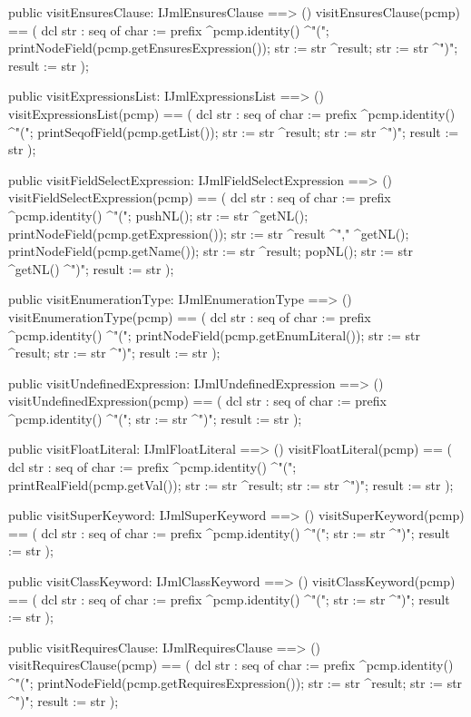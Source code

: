 \begin{vdm_al}
  public visitEnsuresClause: IJmlEnsuresClause ==> ()
  visitEnsuresClause(pcmp) ==
    ( dcl str : seq of char := prefix ^pcmp.identity() ^"(";
      printNodeField(pcmp.getEnsuresExpression());
      str := str ^result;
      str := str ^")";
      result := str );

  public visitExpressionsList: IJmlExpressionsList ==> ()
  visitExpressionsList(pcmp) ==
    ( dcl str : seq of char := prefix ^pcmp.identity() ^"(";
      printSeqofField(pcmp.getList());
      str := str ^result;
      str := str ^")";
      result := str );

  public visitFieldSelectExpression: IJmlFieldSelectExpression ==> ()
  visitFieldSelectExpression(pcmp) ==
    ( dcl str : seq of char := prefix ^pcmp.identity() ^"(";
      pushNL();
      str := str ^getNL();
      printNodeField(pcmp.getExpression());
      str := str ^result ^"," ^getNL();
      printNodeField(pcmp.getName());
      str := str ^result;
      popNL();
      str := str ^getNL() ^")";
      result := str );

  public visitEnumerationType: IJmlEnumerationType ==> ()
  visitEnumerationType(pcmp) ==
    ( dcl str : seq of char := prefix ^pcmp.identity() ^"(";
      printNodeField(pcmp.getEnumLiteral());
      str := str ^result;
      str := str ^")";
      result := str );

  public visitUndefinedExpression: IJmlUndefinedExpression ==> ()
  visitUndefinedExpression(pcmp) ==
    ( dcl str : seq of char := prefix ^pcmp.identity() ^"(";
      str := str ^")";
      result := str );

  public visitFloatLiteral: IJmlFloatLiteral ==> ()
  visitFloatLiteral(pcmp) ==
    ( dcl str : seq of char := prefix ^pcmp.identity() ^"(";
      printRealField(pcmp.getVal());
      str := str ^result;
      str := str ^")";
      result := str );

  public visitSuperKeyword: IJmlSuperKeyword ==> ()
  visitSuperKeyword(pcmp) ==
    ( dcl str : seq of char := prefix ^pcmp.identity() ^"(";
      str := str ^")";
      result := str );

  public visitClassKeyword: IJmlClassKeyword ==> ()
  visitClassKeyword(pcmp) ==
    ( dcl str : seq of char := prefix ^pcmp.identity() ^"(";
      str := str ^")";
      result := str );

  public visitRequiresClause: IJmlRequiresClause ==> ()
  visitRequiresClause(pcmp) ==
    ( dcl str : seq of char := prefix ^pcmp.identity() ^"(";
      printNodeField(pcmp.getRequiresExpression());
      str := str ^result;
      str := str ^")";
      result := str );


\end{vdm_al}

